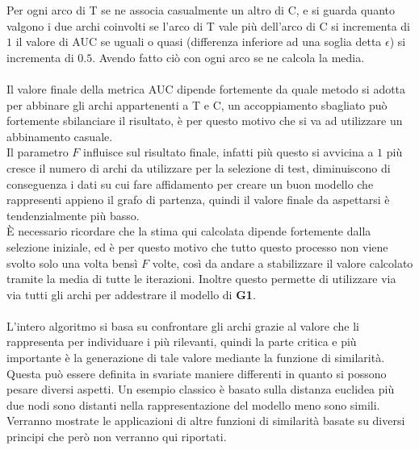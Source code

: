 Per ogni arco di T se ne associa casualmente un altro di C, e si guarda quanto valgono i due archi coinvolti se l'arco di T vale più dell'arco di C si incrementa di $1$ il valore di AUC se uguali o quasi (differenza inferiore ad una soglia detta $\displaystyle \epsilon$) si incrementa di $0.5$. Avendo fatto ciò con ogni arco se ne calcola la media.\\
\\
Il valore finale della metrica AUC dipende fortemente da quale metodo si adotta per abbinare gli archi appartenenti a T e C, un accoppiamento sbagliato può fortemente sbilanciare il risultato, è per questo motivo che si va ad utilizzare un abbinamento casuale.\\
Il parametro $F$ influisce sul risultato finale, infatti più questo si avvicina a $1$ più cresce il numero di archi da utilizzare per la selezione di test, diminuiscono di conseguenza i dati su cui fare affidamento per creare un buon modello che rappresenti appieno il grafo di partenza, quindi il valore finale da aspettarsi è tendenzialmente più basso.\\
È necessario ricordare che la stima qui calcolata dipende fortemente dalla selezione iniziale, ed è per questo motivo che tutto questo processo non viene svolto solo una volta bensì $F$ volte, così da andare a stabilizzare il valore calcolato tramite la media di tutte le iterazioni. Inoltre questo permette di utilizzare via via tutti gli archi per addestrare il modello di \textbf{G1}.\\
\\
L'intero algoritmo si basa su confrontare gli archi grazie al valore che li rappresenta per individuare i più rilevanti, quindi la parte critica e più importante è la generazione di tale valore mediante la funzione di similarità.\\
Questa può essere definita in svariate maniere differenti in quanto si possono pesare diversi aspetti. Un esempio classico è basato sulla distanza euclidea più due nodi sono distanti nella rappresentazione del modello meno sono simili. Verranno mostrate le applicazioni di altre funzioni di similarità basate su diversi principi che però non verranno qui riportati.
%
